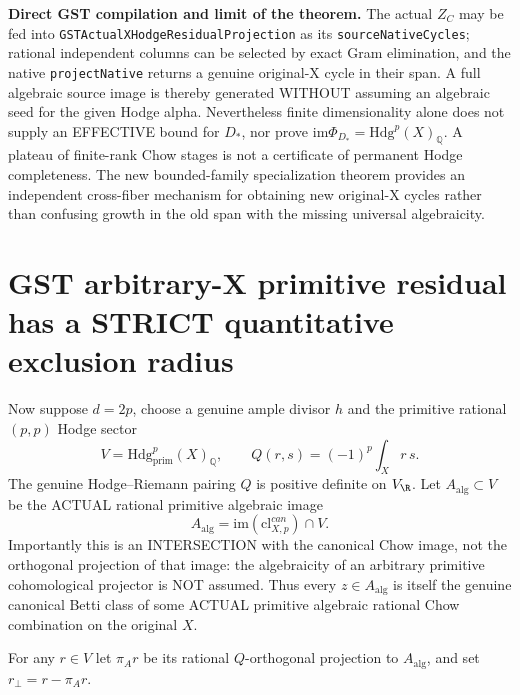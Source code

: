 \documentclass[11pt]{article}
\newcommand{\Q}{\mathbb Q}
\newcommand{\Hdg}{\mathrm{Hdg}}
\newcommand{\cl}{\mathrm{cl}}
\newcommand{\im}{\mathrm{im}}
\begin{document}
\noindent\textbf{Direct GST compilation and limit of the theorem.}
The actual
\(Z_C\) may be
fed into
\texttt{GSTActualXHodgeResidualProjection}
as its
\texttt{sourceNativeCycles};
rational
independent
columns can be
selected by
exact Gram
elimination,
and the
native
\texttt{projectNative}
returns a
genuine original-X
cycle in their span.
A full
algebraic
source image
is thereby
generated
WITHOUT
assuming an
algebraic seed
for the
given Hodge
alpha.
Nevertheless
finite dimensionality
alone does
not supply an
EFFECTIVE bound
for \(D_*\),
nor prove
\(\im\Phi_{D_*}
=\Hdg^p(X)_\Q\).
A plateau
of finite-rank
Chow stages
is not a
certificate of
permanent Hodge
completeness.
The new
bounded-family
specialization
theorem provides
an independent
cross-fiber
mechanism for
obtaining new
original-X
cycles rather
than confusing
growth in
the old span
with the
missing universal
algebraicity.

\section{GST arbitrary-X primitive residual has a STRICT quantitative exclusion radius}
Now suppose \(d=2p\), choose a genuine
ample divisor \(h\) and the primitive
rational \((p,p)\) Hodge sector
\[
 V=\Hdg_{\mathrm{prim}}^p(X)_\Q,\qquad
 Q(r,s)=(-1)^p\int_Xr\,s.
\]
The genuine Hodge--Riemann pairing \(Q\)
is positive definite on \(V_\R\).
Let
\(A_{\mathrm{alg}}\subset V\)
be the ACTUAL rational
primitive algebraic image
\[
 A_{\mathrm{alg}}=
  \im(\cl^{can}_{X,p})\cap V.
\]
Importantly this is an INTERSECTION
with the canonical Chow image,
not the orthogonal projection of
that image: the algebraicity of an
arbitrary primitive cohomological
projector is NOT assumed.
Thus every \(z\in A_{\mathrm{alg}}\)
is itself the genuine canonical
Betti class of some ACTUAL
primitive algebraic rational Chow
combination on the original \(X\).

For any \(r\in V\) let
\(\pi_A r\) be its rational
\(Q\)-orthogonal projection
to \(A_{\mathrm{alg}}\), and
set \(r_\perp=r-\pi_A r\).
\end{document}
